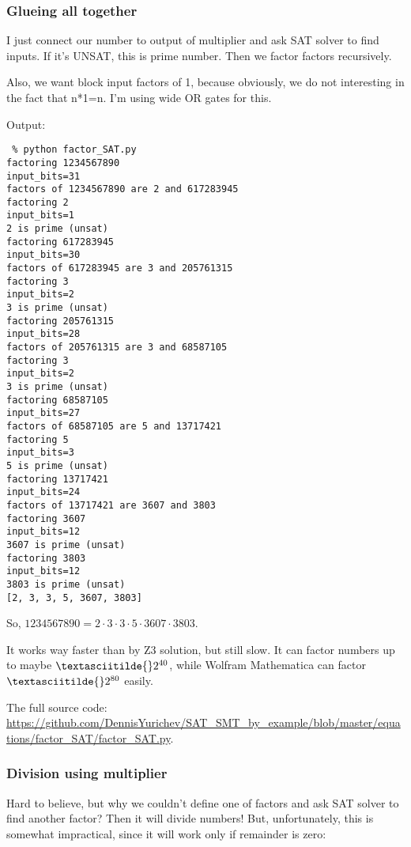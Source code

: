 \subsubsection{Glueing all together}


I just connect our number to output of multiplier and ask SAT solver to find inputs.
If it's UNSAT, this is prime number.
Then we factor factors recursively.

Also, we want block input factors of 1, because obviously, we do not interesting in the fact that n*1=n.
I'm using wide OR gates for this.

Output:

\begin{lstlisting}
 % python factor_SAT.py
factoring 1234567890
input_bits=31
factors of 1234567890 are 2 and 617283945
factoring 2
input_bits=1
2 is prime (unsat)
factoring 617283945
input_bits=30
factors of 617283945 are 3 and 205761315
factoring 3
input_bits=2
3 is prime (unsat)
factoring 205761315
input_bits=28
factors of 205761315 are 3 and 68587105
factoring 3
input_bits=2
3 is prime (unsat)
factoring 68587105
input_bits=27
factors of 68587105 are 5 and 13717421
factoring 5
input_bits=3
5 is prime (unsat)
factoring 13717421
input_bits=24
factors of 13717421 are 3607 and 3803
factoring 3607
input_bits=12
3607 is prime (unsat)
factoring 3803
input_bits=12
3803 is prime (unsat)
[2, 3, 3, 5, 3607, 3803]
\end{lstlisting}

So, $1234567890 = 2 \cdot 3 \cdot 3 \cdot 5 \cdot 3607 \cdot 3803$.

It works way faster than by Z3 solution, but still slow.
It can factor numbers up to maybe $\textasciitilde{}2^{40}$, while Wolfram Mathematica can factor
$\textasciitilde{}2^{80}$ easily.

The full source code: \url{https://github.com/DennisYurichev/SAT_SMT_by_example/blob/master/equations/factor_SAT/factor_SAT.py}.

\subsubsection{Division using multiplier}

Hard to believe, but why we couldn't define one of factors and ask SAT solver to find another factor?
Then it will divide numbers!
But, unfortunately, this is somewhat impractical, since it will work only if remainder is zero:



